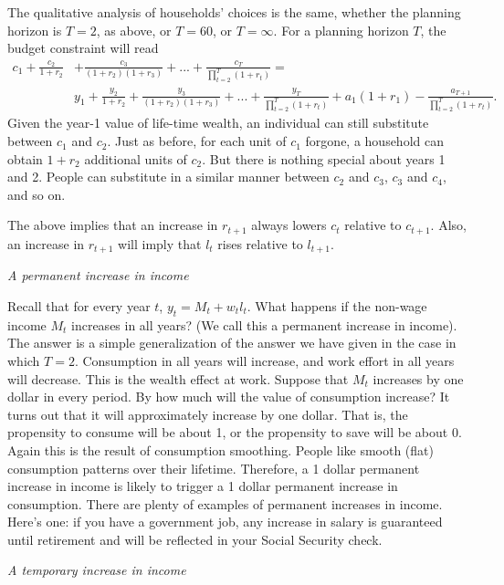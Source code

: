 \documentclass[letterpaper,12pt]{article}
\begin{document}
The qualitative analysis of households' choices is the same, whether the planning horizon is
$T=2$, as above, or $T=60$, or $T=\infty$. For a planning horizon $T$, the budget constraint will
read
%
\begin{align*}
c_{1}+\frac{c_{2}}{1+r_{2}}&+\frac{c_{3}}{(1+r_{2})(1+r_{3})}+...+\frac{c_{T}}{\prod_{t=2}^{T}(1+r_{t})}=\\
&y_{1}+\frac{y_{2}}{1+r_{2}}+\frac{y_{3}}{(1+r_{2})(1+r_{3})}+...+\frac{y_{T}}{\prod_{t=2}^{T}(1+r_{t})}+a_{1}(1+r_{1})-\frac{a_{T+1}}{\prod_{t=2}^{T}(1+r_{t})}.
\end{align*}
%
Given the year-1 value of life-time wealth, an individual can still substitute between $c_{1}$ and
$c_{2}$. Just as before, for each unit of $c_{1}$ forgone, a household can obtain $1+r_{2}$
additional units of $c_{2}$. But there is nothing special about years 1 and 2. People can
substitute in a similar manner between $c_{2}$ and $c_{3}$, $c_{3}$ and $c_{4}$, and so on.

The above implies that an increase in $r_{t+1}$ always lowers $c_{t}$ relative to $c_{t+1}$. Also,
an increase in $r_{t+1}$ will imply that $l_{t}$ rises relative to $l_{t+1}$.

\newpage

\textit{A permanent increase in income}

Recall that for every year $t$, $y_{t}=M_{t}+w_{t}l_{t}$. What
happens if the non-wage income $M_{t}$ increases in all years? (We
call this a permanent increase in income). The answer is a simple
generalization of the answer we have given in the case in which
$T=2$. Consumption in all years will increase, and work effort in
all years will decrease. This is the wealth effect at work.
Suppose that $M_{t}$ increases by one dollar in every period. By
how much will the value of consumption increase? It turns out that
it will approximately increase by one dollar. That is, the
propensity to consume will be about 1, or the propensity to save
will be about 0. Again this is the result of consumption
smoothing. People like smooth (flat) consumption patterns over
their lifetime. Therefore, a 1 dollar permanent increase in income
is likely to trigger a 1 dollar permanent increase in consumption.
There are plenty of examples of permanent increases in income.
Here's one: if you have a government job, any increase in salary
is guaranteed until retirement and will be reflected in your
Social Security check.

\textit{A temporary increase in income}
\end{document}
